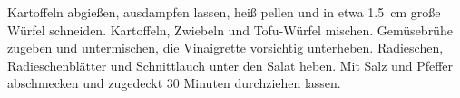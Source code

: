 \begin{recipe}
{        \step Kartoffeln abgießen, ausdampfen lassen, heiß pellen und in etwa \SI{1,5}{\cm} große Würfel schneiden. Kartoffeln, Zwiebeln und Tofu-Würfel mischen. Gemüsebrühe zugeben und untermischen, die Vinaigrette vorsichtig unterheben. Radieschen, Radieschenblätter und Schnittlauch unter den Salat heben. Mit Salz und Pfeffer abschmecken und zugedeckt 30 Minuten durchziehen lassen.
    }


\end{recipe}
